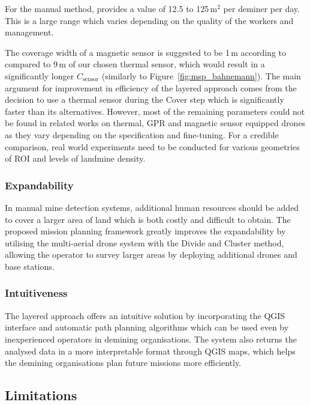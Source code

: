 For the manual method, \cite{gichd2005manual} provides a value of 12.5 to 125\,m$^2$ per deminer per day. This is a large range which varies depending on the quality of the workers and management.

The coverage width of a magnetic sensor is suggested to be 1\,m according to \cite{Yoo2024UnmannedAV} compared to 9\,m of our chosen thermal sensor, which would result in a significantly longer $C_{\mathrm{sensor}}$ (similarly to Figure~\ref{fig:msp_bahnemann}). The main argument for improvement in efficiency of the layered approach comes from the decision to use a thermal sensor during the Cover step which is significantly faster than its alternatives. However, most of the remaining parameters could not be found in related works on thermal, \gls{GPR} and magnetic sensor equipped drones as they vary depending on the specification and fine-tuning. For a credible comparison, real world experiments need to be conducted for various geometries of \gls{ROI} and levels of landmine density.  

\subsubsection{Expandability}

In manual mine detection systems, additional human resources should be added to cover a larger area of land which is both costly and difficult to obtain. The proposed mission planning framework greatly improves the expandability by utilising the multi-aerial drone system with the Divide and Cluster method, allowing the operator to survey larger areas by deploying additional drones and base stations. 

\subsubsection{Intuitiveness}

The layered approach offers an intuitive solution by incorporating the \gls{QGIS} interface and automatic path planning algorithms which can be used even by inexperienced operators in demining organisations. The system also returns the analysed data in a more interpretable format through \gls{QGIS} maps, which helps the demining organisations plan future missions more efficiently.

\subsection{Limitations}
\label{sec:msp_limitations}

